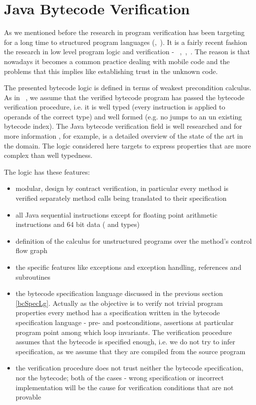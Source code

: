 
\section{Java Bytecode Verification}\label{verifCond}
As we mentioned before the research in program verification has been targeting for a long time to structured program languages (\cite{WPCDS},~\cite{DisDij}). 
It is a fairly recent fashion the research in low level program logic and verification -  ~\cite{B04tlsj},~\cite{BM05plb},~\cite{Quigley}.
The reason is that nowadays it becomes a common practice dealing with mobile code and the problems that this implies like establishing trust in the unknown code. 

The presented bytecode logic is defined in terms of weakest precondition calculus. As in ~\cite{BM05plb}, we assume 
that the verified bytecode program has passed the bytecode verification procedure, i.e. it is well typed 
(every instruction is applied to operands of the correct type) and well formed 
(e.g. no jumps to an un existing bytecode index). The Java bytecode verification field is  well researched and 
for more information \cite{Ljbc}, for example, is a detailed overview of the state of the art in the domain. 
The logic considered here targets to express properties that are more complex than well typedness.

The logic has these features:
\begin{itemize}
\item modular, design by contract verification, in particular every method is verified separately method calls being translated to their specification 
\item all Java sequential instructions except for floating point arithmetic instructions and 64 bit data ( and  types)
\item definition of the calculus for unstructured programs over the method's control flow graph
\item the specific features like exceptions and exception handling, references and subroutines
\item the bytecode specification language discussed in the previous section \ref{bcSpecLg}. 
Actually as the objective is to verify not trivial program properties every method has a specification written 
in the bytecode specification language - pre- and postconditions, assertions at particular program point among 
which loop invariants. The verification procedure assumes that the bytecode is specified enough, i.e. 
we do not try to infer specification, as we assume that they are compiled from the source program
\item the verification procedure does not trust neither the bytecode specification, nor the bytecode; both of the cases - wrong 
specification or incorrect implementation will be the cause for verification conditions that are not provable 
\end{itemize}


